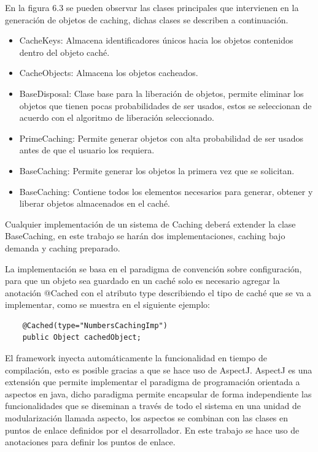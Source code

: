 \documentclass[12pt,a4paper,spanish,openany]{book}
\begin{document}
En la figura 6.3 se pueden observar las clases principales que intervienen en la
generación de objetos de caching, dichas clases se describen a continuación.

\begin{itemize}
  \item CacheKeys: Almacena identificadores únicos hacia los objetos contenidos
  dentro del objeto caché.
  \item CacheObjects: Almacena los objetos cacheados.
  \item BaseDisposal: Clase base para la liberación de objetos, permite eliminar
  los objetos que tienen pocas probabilidades de ser usados, estos se
  seleccionan de acuerdo con el algoritmo de liberación seleccionado.
  \item PrimeCaching: Permite generar objetos con alta probabilidad de
  ser usados antes de que el usuario los requiera.
  \item BaseCaching: Permite generar los objetos la primera vez que se
  solicitan.
  \item BaseCaching: Contiene todos los elementos necesarios para generar,
  obtener y liberar objetos almacenados en el caché.
\end{itemize}

Cualquier implementación de un sistema de Caching deberá extender la clase
BaseCaching, en este trabajo se harán dos implementaciones, caching bajo demanda
y caching preparado.

La implementación se basa en el paradigma de convención sobre configuración,
para que un objeto sea guardado en un caché solo es necesario agregar la
anotación @Cached con el atributo type describiendo el tipo de caché que se va
a implementar, como se muestra en el siguiente ejemplo:

\begin{verbatim}
    @Cached(type="NumbersCachingImp")
    public Object cachedObject;
\end{verbatim}

El framework inyecta automáticamente la funcionalidad en tiempo de compilación,
esto es posible gracias a que se hace uso de AspectJ. AspectJ es una extensión
que permite implementar el paradigma de programación orientada a aspectos en
java, dicho paradigma permite encapsular de forma independiente las
funcionalidades que se diseminan a través de todo el sistema en una unidad de
modularización llamada aspecto, los aspectos se combinan con las clases en
puntos de enlace definidos por el desarrollador. En este trabajo se hace uso de anotaciones para
definir los puntos de enlace.
\end{document}
